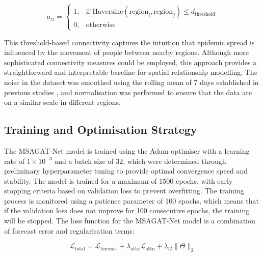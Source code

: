\documentclass[a4paper,fleqn]{cas-dc}
\begin{document}
\begin{equation}
a_{ij} = 
\begin{cases}
1, & \text{if } \text{Haversine}(\text{region}_i, \text{region}_j) \leq d_{\text{threshold}} \\
0, & \text{otherwise}
\end{cases}
\end{equation}

This threshold-based connectivity captures the intuition that epidemic spread is influenced by the movement of people between nearby regions. Although more sophisticated connectivity measures could be employed, this approach provides a straightforward and interpretable baseline for spatial relationship modelling. The noise in the dataset was smoothed using the rolling mean of 7 days established in previous studies \cite{ajao2023deep, oluwasakin2023data, zeroual2020deep, Kamalov2022ReviewDL}, and normalisation was performed to ensure that the data are on a similar scale in different regions.

\subsection{Training and Optimisation Strategy}
\label{sec:optimisation}

The MSAGAT-Net model is trained using the Adam optimiser with a learning rate of $1 \times 10^{-3}$ and a batch size of 32, which were determined through preliminary hyperparameter tuning to provide optimal convergence speed and stability. The model is trained for a maximum of 1500 epochs, with early stopping criteria based on validation loss to prevent overfitting. The training process is monitored using a patience parameter of 100 epochs, which means that if the validation loss does not improve for 100 consecutive epochs, the training will be stopped. The loss function for the MSAGAT-Net model is a combination of forecast error and regularisation terms:

\begin{equation}
\label{eq:total_loss}
\mathcal{L}_{\text{total}} = \mathcal{L}_{\text{forecast}} + \lambda_{\text{attn}}\mathcal{L}_{\text{attn}} + \lambda_{\text{l2}}\|\Theta\|_2
\end{equation}
\end{document}

